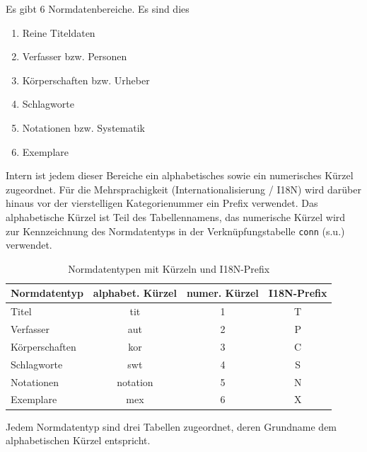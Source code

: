 \documentclass[11pt, twoside, a4paper, BCOR8mm, DIV12, bibtotoc,idxtotoc]{scrbook}
\begin{document}
Es gibt 6 Normdatenbereiche. Es sind dies
\begin{enumerate}
\item Reine Titeldaten
\item Verfasser bzw. Personen
\item Körperschaften bzw. Urheber
\item Schlagworte
\item Notationen bzw. Systematik
\item Exemplare
\end{enumerate}

Intern ist jedem dieser Bereiche ein alphabetisches sowie ein
numerisches Kürzel zugeordnet. Für die Mehrsprachigkeit
(Internationalisierung / I18N) wird darüber hinaus vor der vierstelligen
Kategorienummer ein Prefix verwendet. Das alphabetische Kürzel ist
Teil des Tabellen\-namens, das numerische Kürzel wird zur
Kennzeichnung des Normdatentyps in der Verknüpfungs\-tabelle
\texttt{conn} (s.u.)  verwendet.

\begin{table}
  \begin{shadowenv}
    \vspace{3mm}
    \begin{center}
      \begin{tabular}[c]{lccc}
        Normdatentyp   & alphabet. Kürzel & numer. Kürzel & I18N-Prefix\\
        \hline
        Titel          & tit              & 1             & T\\
        Verfasser      & aut              & 2             & P\\
        Körperschaften & kor              & 3             & C\\
        Schlagworte    & swt              & 4             & S\\
        Notationen     & notation         & 5             & N\\
        Exemplare      & mex              & 6             & X\\
      \end{tabular}
    \end{center}
    \caption{Normdatentypen mit Kürzeln und I18N-Prefix\label{normkuerzprefix}}
    \vspace{3mm}
  \end{shadowenv}
\end{table}

Jedem Normdatentyp sind drei Tabellen zugeordnet, deren Grundname
dem alphabetischen Kürzel entspricht.
\end{document}
